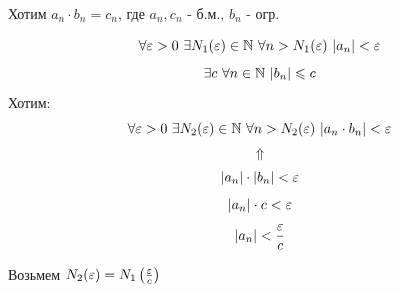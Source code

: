 \begin{theorem}
\end{theorem}

\begin{Proof}
    Хотим $ a_n \cdot b_n = c_n $, где $a_n, c_n$ - б.м., $b_n$ - огр.

    $$ \forall \varepsilon > 0\ \exists N_1(\varepsilon) \in \mathbb{N}\ \forall n > N_1(\varepsilon)\ |a_n| < \varepsilon $$
    $$ \exists c\ \forall n \in \mathbb{N}\ |b_n| \leqslant c $$
    Хотим:
    $$ \forall \eps > 0\ \exists N_2(\eps) \in \N\ \forall n > N_2(\eps)\ |a_n \cdot b_n| < \eps $$
    $$ \Uparrow $$
    $$ |a_n| \cdot |b_n| < \varepsilon $$
    $$ |a_n| \cdot c < \varepsilon $$
    $$ |a_n| < \frac{\varepsilon}{c} $$

    Возьмем $N_2(\varepsilon) = N_1\left(\frac{\varepsilon}{c}\right)$
\end{Proof}

